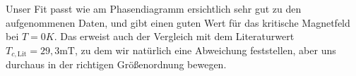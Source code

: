 Unser Fit passt wie am Phasendiagramm ersichtlich sehr gut zu den aufgenommenen Daten, und gibt einen guten Wert für das kritische Magnetfeld bei $T=0K$.
Das erweist auch der Vergleich mit dem Literaturwert $ T_{c,\textrm{Lit}} = 29,3\textrm{mT}$, zu dem wir natürlich eine Abweichung feststellen, aber uns durchaus in der richtigen Größenordnung bewegen. 


